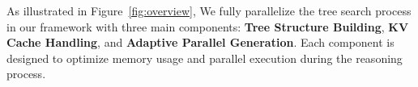     

As illustrated in Figure~\ref{fig:overview}, We fully parallelize the tree search process in our framework with three main components: \textbf{Tree Structure Building}, \textbf{KV Cache Handling}, and \textbf{Adaptive Parallel Generation}. Each component is designed to optimize memory usage and parallel execution during the reasoning process. 



